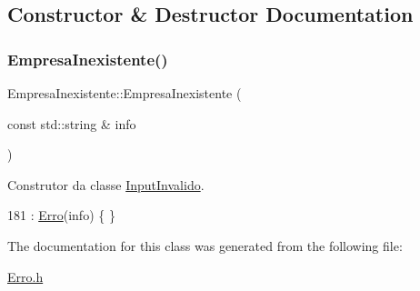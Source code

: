 \subsection{Constructor \& Destructor Documentation}
\mbox{\label{classEmpresaInexistente_a96bfdab77510c1f330c6c66b7df19edd}} 
\subsubsection{\texorpdfstring{Empresa\+Inexistente()}{EmpresaInexistente()}}
{\footnotesize\ttfamily Empresa\+Inexistente\+::\+Empresa\+Inexistente (\begin{DoxyParamCaption}\item[{const std\+::string \&}]{info }\end{DoxyParamCaption})\hspace{0.3cm}{\ttfamily [inline]}}



Construtor da classe \hyperlink{classInputInvalido}{Input\+Invalido}. 


\begin{DoxyCode}
181 : \hyperlink{classErro_a15d79796bd17517ff05d45eee55556f1}{Erro}(info) \{ \}
\end{DoxyCode}


The documentation for this class was generated from the following file\+:\begin{DoxyCompactItemize}
\item 
\hyperlink{Erro_8h}{Erro.\+h}\end{DoxyCompactItemize}
